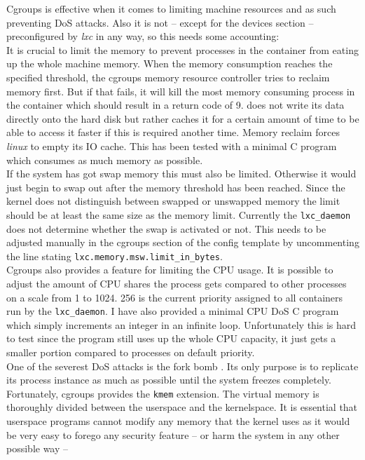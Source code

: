 Cgroups is effective when it comes to limiting machine resources and as such preventing DoS attacks.
Also it is not -- except for the devices section -- preconfigured by \textit{lxc} in any way, so this needs some accounting:\\
It is crucial to limit the memory to prevent processes in the container from eating up the whole machine memory.
When the memory consumption reaches the specified threshold, the cgroups memory resource controller tries to reclaim memory first.
But if that fails, it will kill the most memory consuming process in the container which should result in a return code of 9\cite{cgrpmem}.
 does not write its data directly onto the hard disk but rather caches it for a certain amount of time to be able to
access it faster if this is required another time. Memory reclaim forces \textit{linux} to empty its IO cache.
This has been tested with a minimal C program which consumes as much memory as possible.\\
If the system has got swap memory this must also be limited. Otherwise it would just begin to swap out after the memory
threshold has been reached. Since the kernel does not distinguish between swapped or unswapped memory the limit should
be at least the same size as the memory limit.
Currently the \texttt{lxc\_daemon} does not determine whether the swap is activated or not. This needs to be adjusted manually in the cgroups
section of the config template by uncommenting the line stating \texttt{lxc.memory.msw.limit\_in\_bytes}.\\
Cgroups also provides a feature for limiting the CPU usage. It is possible to adjust the amount of CPU shares the process gets compared to
other processes on a scale from 1 to 1024. 256 is the current priority assigned to all containers run by the \texttt{lxc\_daemon}.
I have also provided a minimal CPU DoS C program which simply increments an integer in an infinite loop. Unfortunately this is hard to test
since the program still uses up the whole CPU capacity, it just gets a smaller portion compared to processes on default priority.\\
One of the severest DoS attacks is the fork bomb \cite{forkbomb}. Its only purpose is to replicate its process instance as much as possible until
the system freezes completely. Fortunately, cgroups provides
the \texttt{kmem} extension. The virtual memory is thoroughly divided between the userspace and the kernelspace\cite{kernelspace}.
It is essential that userspace programs
cannot modify any memory that the kernel uses as it would be very easy to forego any security feature -- or harm the system in any other possible way --
